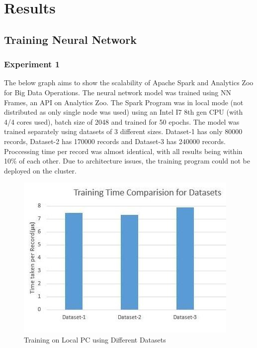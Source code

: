 

\section{Results}

\subsection{Training Neural Network}


\subsubsection{Experiment 1}

    
    
    The below graph aims to show the scalability of Apache Spark and Analytics Zoo for Big Data Operations. The neural network model was trained using NN Frames, an API on Analytics Zoo. The Spark Program was in local mode (not distributed as only single node was used) using an Intel I7 8th gen CPU (with 4/4 cores used), batch size of 2048 and trained for 50 epochs. The model was trained separately using datasets of 3 different sizes. Dataset-1 has only 80000 records, Dataset-2 has 170000 records and Dataset-3 has 240000 records. Proccessing time per record was almost identical, with all results being within 10\% of each other. Due to architecture issues, the training program could not be deployed on the cluster.  
    
    \begin{figure}[H]
          
          \includegraphics[scale=0.8]{images/Exp1.JPG}
          \caption{Training on Local PC using Different Datasets}
          \label{fig:Exp1}
              
    \end{figure}

